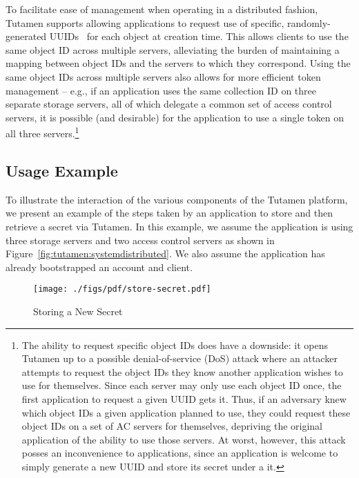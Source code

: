 To facilitate ease of management when operating in a distributed
fashion, Tutamen supports allowing applications to request use of
specific, randomly-generated UUIDs~\cite{leach2005} for each object at
creation time. This allows clients to use the same object ID across
multiple servers, alleviating the burden of maintaining a mapping
between object IDs and the servers to which they correspond. Using the
same object IDs across multiple servers also allows for more efficient
token management -- e.g., if an application uses the same collection
ID on three separate storage servers, all of which delegate a common
set of access control servers, it is possible (and desirable) for the
application to use a single token on all three servers.\footnote{The
  ability to request specific object IDs does have a downside: it
  opens Tutamen up to a possible denial-of-service (DoS) attack where
  an attacker attempts to request the object IDs they know another
  application wishes to use for themselves. Since each server may only
  use each object ID once, the first application to request a given
  UUID gets it. Thus, if an adversary knew which object IDs a given
  application planned to use, they could request these object IDs on a
  set of AC servers for themselves, depriving the original application
  of the ability to use those servers. At worst, however, this attack
  posses an inconvenience to applications, since an application is
  welcome to simply generate a new UUID and store its secret under a
  it.}

\subsection{Usage Example}

To illustrate the interaction of the various components of the Tutamen
platform, we present an example of the steps taken by an application
to store and then retrieve a secret via Tutamen. In this example, we
assume the application is using three storage servers and two access
control servers as shown in
Figure~\ref{fig:tutamen:systemdistributed}. We also assume the
application has already bootstrapped an account and client.

\begin{figure}[th]
  \centering
  \texttt{[image: ./figs/pdf/store-secret.pdf]}
  \caption{Storing a New Secret}
  \label{fig:tutamen:storesecret}
\end{figure}

